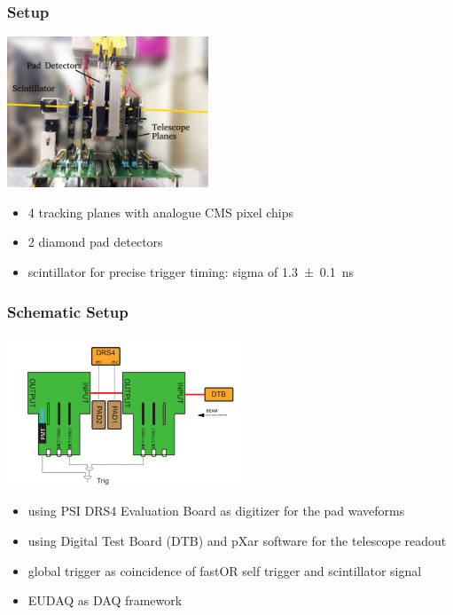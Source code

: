 \documentclass[9pt]{beamer}
\begin{document}
\begin{frame}
	\frametitle{Setup}
	\begin{center}
		\includegraphics[width=6cm]{Setup}
	\end{center}
	\begin{itemize}
		\setlength{\itemsep}{\fill}
		\item 4 tracking planes with analogue CMS pixel chips
		\item 2 diamond pad detectors
		\item scintillator for precise trigger timing: sigma of \SI{1.3\pm.1}{ns}
	\end{itemize}
\end{frame}
\begin{frame}
	\frametitle{Schematic Setup}
	\begin{center}
		\includegraphics[width=7cm]{Schematics}
	\end{center}
	\begin{itemize}
		\setlength{\itemsep}{\fill}
		\item using PSI DRS4 Evaluation Board as digitizer for the pad waveforms
		\item using Digital Test Board (DTB) and pXar software for the telescope readout
		\item global trigger as coincidence of fastOR self trigger and scintillator signal
		\item EUDAQ as DAQ framework
	\end{itemize}
\end{frame}
\end{document}
